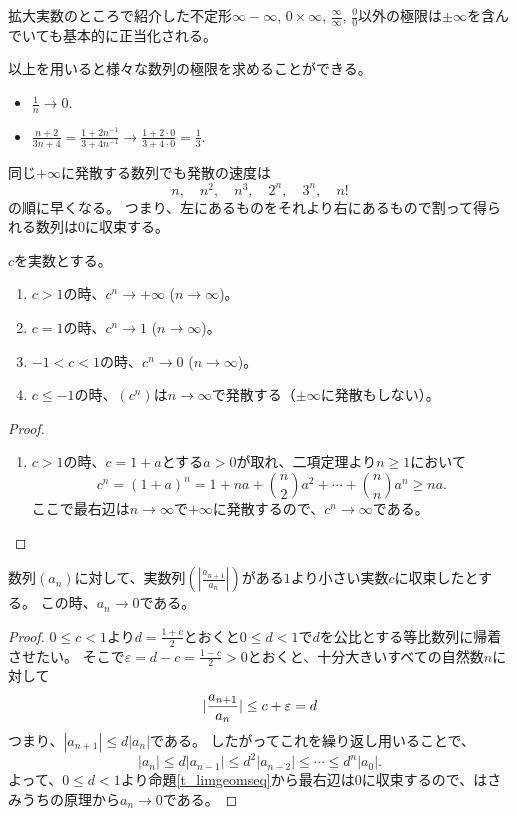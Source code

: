拡大実数のところで紹介した不定形$\infty-\infty$, $0\times\infty$, $\frac{\infty}{\infty}$, $\frac{0}{0}$以外の極限は$\pm \infty$を含んでいても基本的に正当化される。

以上を用いると様々な数列の極限を求めることができる。

\begin{example}
\begin{itemize}
\item
$\frac{1}{n} \to 0$.
\item
$\frac{n+2}{3 n+4} = \frac{1+2 n^{-1}}{3+4 n^{-1}} \to \frac{1+2\cdot 0}{3+4\cdot 0} = \frac{1}{3}$.
\end{itemize}
\end{example}

同じ$+\infty$に発散する数列でも発散の速度は
$$
n, \quad n^2, \quad n^3, \quad 2^n, \quad 3^n, \quad n!
$$
の順に早くなる。
つまり、左にあるものをそれより右にあるもので割って得られる数列は$0$に収束する。

\begin{proposition}[等比数列の極限]
\label{t_limgeomseq}
$c$を実数とする。
\begin{enumerate}
\item
$c > 1$の時、$c^n \to +\infty$ ($n \to \infty$)。
\item
$c = 1$の時、$c^n \to 1$ ($n \to \infty$)。
\item
$-1 < c < 1$の時、$c^n \to 0$ ($n \to \infty$)。
\item
$c \le -1$の時、$(c^n)$は$n \to \infty$で発散する（$\pm \infty$に発散もしない）。
\end{enumerate}
\end{proposition}

\begin{proof}
\begin{enumerate}
\item
$c > 1$の時、$c = 1+a$とする$a > 0$が取れ、二項定理より$n \ge 1$において
$$
c^n = (1+a)^n = 1+n a+\binom{n}{2}a^2+\cdots+\binom{n}{n}a^n \ge n a.
$$
ここで最右辺は$n \to \infty$で$+\infty$に発散するので、$c^n \to \infty$である。
\end{enumerate}
\end{proof}

\begin{proposition}
数列$(a_n)$に対して、実数列$(|\frac{a_{n+1}}{a_n}|)$がある$1$より小さい実数$c$に収束したとする。
この時、$a_n \to 0$である。
\end{proposition}

\begin{proof}
$0 \le c < 1$より$d = \frac{1+c}{2}$とおくと$0 \le d < 1$で$d$を公比とする等比数列に帰着させたい。
そこで$\varepsilon = d-c = \frac{1-c}{2} > 0$とおくと、十分大きいすべての自然数$n$に対して
$$
\lvert\frac{a_{n+1}}{a_n}\rvert \le c+\varepsilon = d
$$
つまり、$|a_{n+1}| \le d|a_n|$である。
したがってこれを繰り返し用いることで、
$$
|a_n| \le d|a_{n-1}| \le d^2|a_{n-2}| \le \cdots \le d^n|a_0|.
$$
よって、$0 \le d < 1$より命題\ref{t_limgeomseq}から最右辺は$0$に収束するので、はさみうちの原理から$a_n \to 0$である。
\end{proof}

